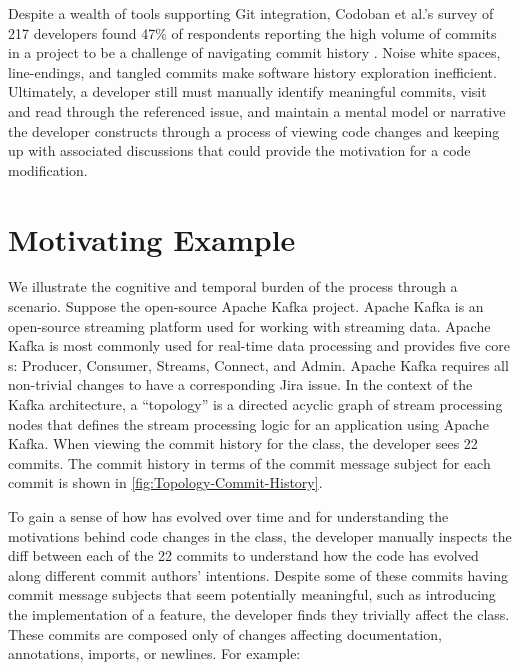 Despite a wealth of tools supporting Git integration, Codoban et al.'s survey of 217 developers found 47\% of respondents reporting the high volume of commits in a project to be a challenge of navigating commit history \cite{codoban_software_2015}. 
Noise \eg white spaces, line-endings, and tangled commits make software history exploration inefficient. 
Ultimately, a developer still must manually identify meaningful commits, visit and read through the referenced issue, and maintain a mental model or narrative the developer constructs through a process of viewing code changes and keeping up with associated discussions that could provide the motivation for a code modification. 


\section{Motivating Example}

We illustrate the cognitive and temporal burden of the process through a scenario.
Suppose  the open-source Apache Kafka project. 
Apache Kafka is an open-source streaming platform used for working with streaming data. 
Apache Kafka is most commonly used for real-time data processing and provides five core s: 
Producer, Consumer, Streams, Connect, and Admin.
Apache Kafka requires all non-trivial changes to have a corresponding Jira issue. 
In the context of the Kafka architecture, a ``topology'' is a directed acyclic graph of stream processing nodes 
that defines the stream processing logic for an application using Apache Kafka.
When viewing the commit history for the  class, the developer sees 22 commits.
The commit history in terms of the commit message subject for each commit is shown in \autoref{fig:Topology-Commit-History}.

To gain a sense of how  has evolved over time 
and for understanding the motivations behind code changes in the class, 
the developer manually inspects the diff between each of the 22 commits to understand 
how the code has evolved along different commit authors' intentions.
Despite some of these commits having commit message subjects that seem potentially 
meaningful, such as introducing the implementation of a feature, 
the developer finds they trivially affect the  class.
These commits are composed only of changes affecting documentation, annotations, imports, or newlines.
For example: 

